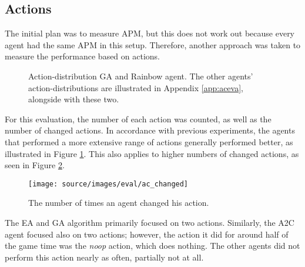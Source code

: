\subsection{Actions}
The initial plan was to measure APM, but this does not work out because every agent had the same APM in this setup. Therefore, another approach was taken to measure the performance based on actions.
\begin{figure}[H]
	\centering
	\qquad
	\caption[Action-distribution GA and Rainbow agent]{Action-distribution GA and Rainbow agent. The other agents' action-distributions are illustrated in Appendix \ref{app:aceva}, alongside with these two.}
	\label{fig:histo_ga_rain}
\end{figure}
For this evaluation, the number of each action was counted, as well as the number of changed actions. In accordance with previous experiments, the agents that performed a more extensive range of actions generally performed better, as illustrated in Figure \ref{fig:histo_ga_rain}. This also applies to higher numbers of changed actions, as seen in Figure \ref{fig:ac_changed}.
\begin{figure}[H]%
\centering
\texttt{[image: source/images/eval/ac\_changed]}%
\caption[Number of actions changed]{The number of times an agent changed his action.}%
\label{fig:ac_changed}%
\end{figure}
The EA and GA algorithm primarily focused on two actions. Similarly, the A2C agent focused also on two actions; however, the action it did for around half of the game time was the \textit{noop} action, which does nothing. The other agents did not perform this action nearly as often, partially not at all.








